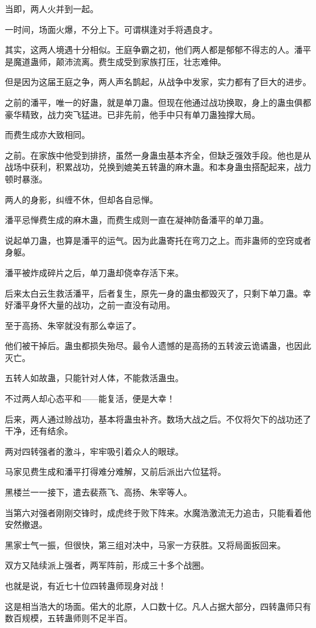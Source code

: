 \begin{this_body}
当即，两人火并到一起。

一时间，场面火爆，不分上下。可谓棋逢对手将遇良才。

其实，这两人境遇十分相似。王庭争霸之初，他们两人都是郁郁不得志的人。潘平是魔道蛊师，颠沛流离。费生成受到家族打压，壮志难伸。

但是因为这届王庭之争，两人声名鹊起，从战争中发家，实力都有了巨大的进步。

之前的潘平，唯一的好蛊，就是单刀蛊。但现在他通过战功换取，身上的蛊虫俱都豪华精致，战力突飞猛进。已非先前，他手中只有单刀蛊独撑大局。

而费生成亦大致相同。

之前。在家族中他受到排挤，虽然一身蛊虫基本齐全，但缺乏强效手段。他也是从战场中获利，积累战功，兑换到媲美五转蛊的麻木蛊。和本身蛊虫搭配起来，战力顿时暴涨。

两人的身影，纠缠不休，但却各自忌惮。

潘平忌惮费生成的麻木蛊，而费生成则一直在凝神防备潘平的单刀蛊。

说起单刀蛊，也算是潘平的运气。因为此蛊寄托在弯刀之上。而非蛊师的空窍或者身躯。

潘平被炸成碎片之后，单刀蛊却侥幸存活下来。

后来太白云生救活潘平，后者复生，原先一身的蛊虫都毁灭了，只剩下单刀蛊。幸好潘平身怀大量的战功，之前一直没有动用。

至于高扬、朱宰就没有那么幸运了。

他们被干掉后。蛊虫都损失殆尽。最令人遗憾的是高扬的五转波云诡谲蛊，也因此灭亡。

五转人如故蛊，只能针对人体，不能救活蛊虫。

不过两人却心态平和——能复活，便是大幸！

后来，两人通过赊战功，基本将蛊虫补齐。数场大战之后。不仅将欠下的战功还了干净，还有结余。

两对四转强者的激斗，牢牢吸引着众人的眼球。

马家见费生成和潘平打得难分难解，又前后派出六位猛将。

黑楼兰一一接下，遣去裴燕飞、高扬、朱宰等人。

当第六对强者刚刚交锋时，成虎终于败下阵来。水魔浩激流无力追击，只能看着他安然撤退。

黑家士气一振，但很快，第三组对决中，马家一方获胜。又将局面扳回来。

双方又陆续派上强者，两军阵前，形成三十多个战圈。

也就是说，有近七十位四转蛊师现身对战！

这是相当浩大的场面。偌大的北原，人口数十亿。凡人占据大部分，四转蛊师只有数百规模，五转蛊师则不足半百。


\end{this_body}
